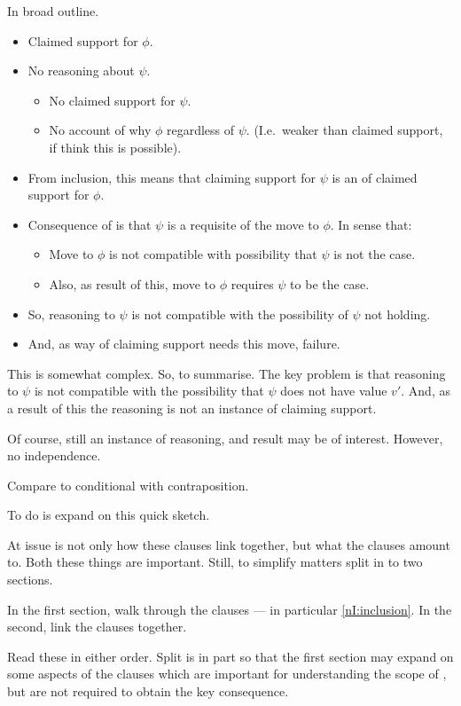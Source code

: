 \begin{note}
  In broad outline.

  \begin{itemize}
  \item Claimed support for \(\phi\).
  \item No reasoning about \(\psi\).
    \begin{itemize}
    \item No claimed support for \(\psi\).
    \item No account of why \(\phi\) regardless of \(\psi\). (I.e.\ weaker than claimed support, if think this is possible).
    \end{itemize}
  \item From inclusion, this means that claiming support for \(\psi\) is an \expec{} of claimed support for \(\phi\).
  \item Consequence of \expec{} is that \(\psi\) is a requisite of the move to \(\phi\).
    In sense that:
    \begin{itemize}
    \item Move to \(\phi\) is not compatible with possibility that \(\psi\) is not the case.
    \item Also, as result of this, move to \(\phi\) requires \(\psi\) to be the case.
    \end{itemize}
  \item So, reasoning to \(\psi\) is not compatible with the possibility of \(\psi\) not holding.
  \item And, as way of claiming support needs this move, failure.
  \end{itemize}

  This is somewhat complex.
  So, to summarise.
  The key problem is that reasoning to \(\psi\) is not compatible with the possibility that \(\psi\) does not have value \(v'\).
  And, as a result of this the reasoning is not an instance of claiming support.

  Of course, still an instance of reasoning, and result may be of interest.
  However, no independence.

  {
    \color{red}
    Compare to conditional with contraposition.
  }
\end{note}

\begin{note}
  To do is expand on this quick sketch.

  At issue is not only how these clauses link together, but what the clauses amount to.
  Both these things are important.
  Still, to simplify matters split in to two sections.

  In the first section, walk through the clauses --- in particular \ref{nI:inclusion}.
  In the second, link the clauses together.

  Read these in either order.
  Split is in part so that the first section may expand on some aspects of the clauses which are important for understanding the scope of \nI{}, but are not required to obtain the key consequence.
\end{note}




